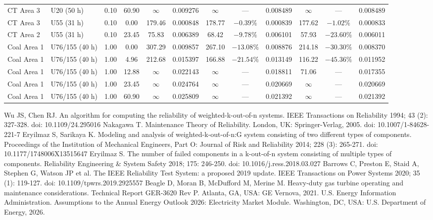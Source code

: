 \documentclass[10pt,a4paper]{article}
\begin{document}
\begin{table}[htbp]
\begin{tabular*}{\textwidth}{@{\extracolsep{\fill}}llcc|cc|ccc|ccc@{}}
CT Area 3 & U20 (50 h)    & 0.10 & 60.90 & $\infty$ & 0.009276 & $\infty$ & ---      & 0.008489 & $\infty$ & ---      & 0.008489 \\
CT Area 3 & U55 (31 h)    & 0.10 & 0.00  & 179.46 & 0.000848 & 178.77 & $-0.39\%$  & 0.000839 & 177.62 & $-1.02\%$  & 0.000833 \\
CT Area 2 & U55 (31 h)    & 0.10 & 23.45 & 75.83  & 0.006389 & 68.42  & $-9.78\%$  & 0.006101 & 57.93  & $-23.60\%$ & 0.006011 \\
\midrule
Coal Area 1 & U76/155 (40 h) & 1.00 & 0.00  & 307.29 & 0.009857 & 267.10 & $-13.08\%$ & 0.008876 & 214.18 & $-30.30\%$ & 0.008370 \\
Coal Area 1 & U76/155 (40 h) & 1.00 & 4.96  & 212.68 & 0.015397 & 166.88 & $-21.54\%$ & 0.013149 & 116.22 & $-45.36\%$ & 0.011952 \\
Coal Area 1 & U76/155 (40 h) & 1.00 & 12.88 & $\infty$ & 0.022143 & $\infty$ & ---    & 0.018811 & 71.06  & ---        & 0.017355 \\
Coal Area 1 & U76/155 (40 h) & 1.00 & 23.45 & $\infty$ & 0.024764 & $\infty$ & ---    & 0.020669 & $\infty$ & ---      & 0.020669 \\
Coal Area 1 & U76/155 (40 h) & 1.00 & 60.90 & $\infty$ & 0.025809 & $\infty$ & ---    & 0.021392 & $\infty$ & ---      & 0.021392 \\
\bottomrule
\end{tabular*}
\end{table}

\begin{thebibliography}{9}
 Wu JS, Chen RJ. An algorithm for computing the reliability of weighted-k-out-of-n systems. IEEE Transactions on Reliability 1994; 43 (2): 327-328. doi: 10.1109/24.295016
 Nakagawa T. Maintenance Theory of Reliability. London, UK: Springer-Verlag, 2005. doi: 10.1007/1-84628-221-7
 Eryilmaz S, Sarikaya K. Modeling and analysis of weighted-k-out-of-n:G system consisting of two different types of components. Proceedings of the Institution of Mechanical Engineers, Part O: Journal of Risk and Reliability 2014; 228 (3): 265-271. doi: 10.1177/1748006X13515647
 Eryilmaz S. The number of failed components in a k-out-of-n system consisting of multiple types of components. Reliability Engineering \& System Safety 2018; 175: 246-250. doi: 10.1016/j.ress.2018.03.027
 Barrows C, Preston E, Staid A, Stephen G, Watson JP et al. The IEEE Reliability Test System: a proposed 2019 update. IEEE Transactions on Power Systems 2020; 35 (1): 119-127. doi: 10.1109/tpwrs.2019.2925557
 Beagle D, Moran B, McDufford M, Merine M. Heavy-duty gas turbine operating and maintenance considerations. Technical Report GER-3620 Rev P. Atlanta, GA, USA: GE Vernova, 2021.
 U.S. Energy Information Administration. Assumptions to the Annual Energy Outlook 2026: Electricity Market Module. Washington, DC, USA: U.S. Department of Energy, 2026.
\end{thebibliography}
\end{document}
